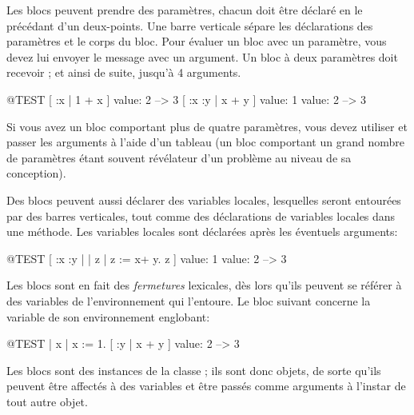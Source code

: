 \documentclass[a4paper,10pt,twoside]{book}
\begin{document}
Les blocs peuvent prendre des param\`etres, chacun doit \^etre
d\'eclar\'e en le précédant d'un deux-points.
Une barre verticale s\'{e}pare les d\'{e}clarations des param\`{e}tres
et le corps du bloc.
Pour \'evaluer un bloc avec un param\`{e}tre, vous devez lui envoyer le message 
  avec un argument.
Un bloc \`{a} deux param\`etres doit recevoir  ; et ainsi de suite, jusqu'\`a 4 arguments.

\begin{code}{@TEST}
[ :x | 1 + x ] value: 2 --> 3
[ :x :y | x + y ] value: 1 value: 2 --> 3
\end{code}

Si vous avez un bloc comportant plus de quatre param\`{e}tres, vous devez utiliser
 et passer les arguments à
l'aide d'un tableau (un bloc comportant un grand nombre de param\`{e}tres étant souvent r\'{e}v\'{e}lateur d'un probl\`{e}me au niveau de sa conception).

Des blocs peuvent aussi d\'{e}clarer des variables locales, lesquelles seront entour\'{e}es par des barres verticales, tout comme des d\'{e}clarations de variables locales dans une m\'{e}thode.
Les variables locales sont d\'{e}clar\'{e}es apr\`{e}s les éventuels
arguments:

\begin{code}{@TEST}
[ :x :y | | z | z := x+ y. z ] value: 1 value: 2 --> 3
\end{code}

Les blocs sont en fait des \emph{fermetures} lexicales, d\`{e}s lors
qu'ils peuvent se r\'{e}f\'{e}rer \`{a} des variables de
l'environnement qui l'entoure.
Le bloc suivant concerne la variable  de son environnement englobant:

\begin{code}{@TEST}
| x |
x := 1.
[ :y | x + y ] value: 2 --> 3
\end{code}

Les blocs sont des instances de la classe ; ils
sont donc objets, de sorte qu'ils peuvent \^{e}tre affect\'{e}s \`{a} des variables et \^{e}tre pass\'{e}s comme arguments \`{a} l'instar de tout autre objet.

\end{document}
